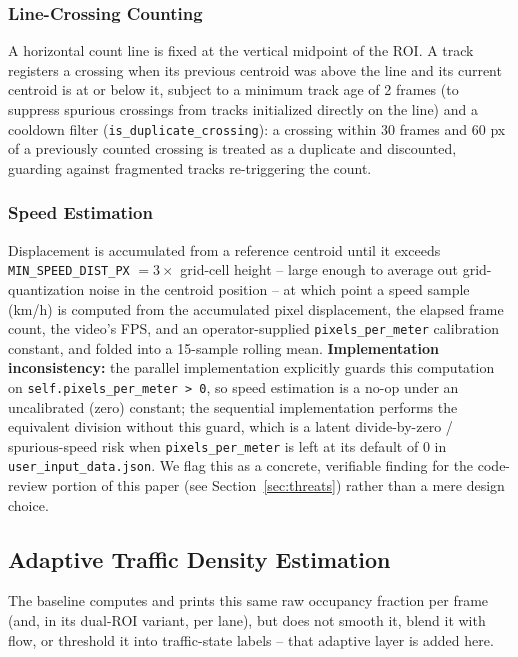 \documentclass[conference]{IEEEtran}
\newcommand{\code}[1]{\texttt{#1}}
\begin{document}
\subsubsection{Line-Crossing Counting}
A horizontal count line is fixed at the vertical midpoint of the ROI. A
track registers a crossing when its previous centroid was above the
line and its current centroid is at or below it, subject to a minimum
track age of 2 frames (to suppress spurious crossings from tracks
initialized directly on the line) and a cooldown filter
(\code{is\_duplicate\_crossing}): a crossing within 30 frames and 60 px
of a previously counted crossing is treated as a duplicate and
discounted, guarding against fragmented tracks re-triggering the count.

\subsubsection{Speed Estimation}
Displacement is accumulated from a reference centroid until it exceeds
\code{MIN\_SPEED\_DIST\_PX} $= 3\times$ grid-cell height -- large enough
to average out grid-quantization noise in the centroid position -- at
which point a speed sample (km/h) is computed from the accumulated pixel
displacement, the elapsed frame count, the video's FPS, and an
operator-supplied \code{pixels\_per\_meter} calibration constant, and
folded into a 15-sample rolling mean. \textbf{Implementation
inconsistency:} the parallel implementation explicitly guards this
computation on \code{self.pixels\_per\_meter > 0}, so speed estimation
is a no-op under an uncalibrated (zero) constant; the sequential
implementation performs the equivalent division without this guard,
which is a latent divide-by-zero / spurious-speed risk when
\code{pixels\_per\_meter} is left at its default of 0 in
\code{user\_input\_data.json}. We flag this as a concrete, verifiable
finding for the code-review portion of this paper (see
Section~\ref{sec:threats}) rather than a mere design choice.

\subsection{Adaptive Traffic Density Estimation}
\label{sec:density}

The baseline \cite{baseline} computes and prints this same raw
occupancy fraction per frame (and, in its dual-ROI variant, per lane),
but does not smooth it, blend it with flow, or threshold it into
traffic-state labels -- that adaptive layer is added here.
\end{document}
